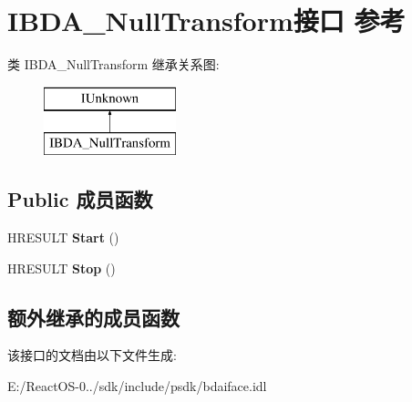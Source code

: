 \hypertarget{interface_i_b_d_a___null_transform}{}\section{I\+B\+D\+A\+\_\+\+Null\+Transform接口 参考}
\label{interface_i_b_d_a___null_transform}
类 I\+B\+D\+A\+\_\+\+Null\+Transform 继承关系图\+:\begin{figure}[H]
\begin{center}
\leavevmode
\includegraphics[height=2.000000cm]{interface_i_b_d_a___null_transform}
\end{center}
\end{figure}
\subsection*{Public 成员函数}
\begin{DoxyCompactItemize}
\item 
\mbox{\label{interface_i_b_d_a___null_transform_acaa1cec20227c3e5bc9be5c51f53a138}} 
H\+R\+E\+S\+U\+LT {\bfseries Start} ()
\item 
\mbox{\label{interface_i_b_d_a___null_transform_afcee6e22bb1873ed0401325a1a3e9bbe}} 
H\+R\+E\+S\+U\+LT {\bfseries Stop} ()
\end{DoxyCompactItemize}
\subsection*{额外继承的成员函数}


该接口的文档由以下文件生成\+:\begin{DoxyCompactItemize}
\item 
E\+:/\+React\+O\+S-\/0../sdk/include/psdk/bdaiface.\+idl\end{DoxyCompactItemize}
